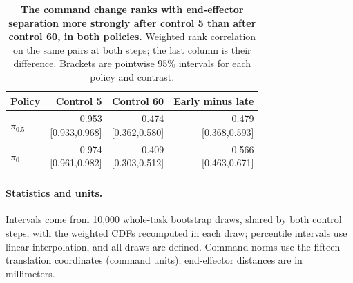 \begin{table}[h]
\caption{\textbf{The command change ranks with end-effector separation more strongly after control 5 than after control 60, in both policies.} Weighted rank correlation on the same pairs at both steps; the last column is their difference. Brackets are pointwise 95\% intervals for each policy and contrast.}
\centering\small
\begin{tabular}{lrrr}\toprule
Policy & Control 5 & Control 60 & Early minus late\\\midrule
$\pi_{0.5}$ & \shortstack{0.953\\{[0.933,0.968]}} & \shortstack{0.474\\{[0.362,0.580]}} & \shortstack{0.479\\{[0.368,0.593]}}\\
$\pi_0$ & \shortstack{0.974\\{[0.961,0.982]}} & \shortstack{0.409\\{[0.303,0.512]}} & \shortstack{0.566\\{[0.463,0.671]}}\\
\bottomrule\end{tabular}

\label{tab:early-late-association}
\end{table}

\paragraph{Statistics and units.}
Intervals come from 10,000 whole-task bootstrap draws, shared by both control steps, with the weighted CDFs recomputed in each draw; percentile intervals use linear interpolation, and all draws are defined. Command norms use the fifteen translation coordinates (command units); end-effector distances are in millimeters.
